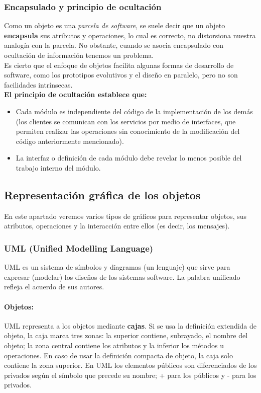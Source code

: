 \subsubsection{Encapsulado y principio de ocultación}
Como un objeto es una \emph{parcela de software}, se suele decir que
un objeto \textbf{encapsula} sus atributos y operaciones, lo cual es
correcto, no distorsiona nuestra analogía con la parcela. No obstante,
cuando se asocia encapsulado con ocultación de información tenemos un
problema.\\
Es cierto que el enfoque de objetos facilita algunas formas de
desarrollo de software, como los prototipos evolutivos y el diseño en
paralelo, pero no son facilidades intrínsecas.\\
\textbf{El principio de ocultación establece que:}
\begin{itemize}
\item Cada módulo es independiente del código de la implementación
  de los demás (los clientes se comunican con los servicios por
  medio de interfaces, que permiten realizar las operaciones sin
  conocimiento de la modificación del código anteriormente
  mencionado).
\item La interfaz o definición de cada módulo debe revelar lo menos
  posible del trabajo interno del módulo.
\end{itemize}

\newpage

\subsection{Representación gráfica de los objetos}
En este apartado veremos varios tipos de gráficos para representar
objetos, sus atributos, operaciones y la interacción entre ellos (es
decir, los mensajes).
\subsubsection{UML (Unified Modelling Language)}
UML es un sistema de símbolos y diagramas (un lenguaje) que sirve para
expresar (modelar) los diseños de los sistemas software. La palabra
unificado refleja el acuerdo de sus autores.

\paragraph{Objetos:}
UML representa a los objetos mediante \textbf{cajas}. Si se usa la
definición extendida de objeto, la caja marca tres zonas: la superior
contiene, subrayado, el nombre del objeto; la zona central contiene
los atributos y la inferior los métodos u operaciones. En caso de usar
la definición compacta de objeto, la caja solo contiene la zona
superior. En UML los elementos públicos son diferenciados de los
privados según el símbolo que precede su nombre; \textrm{+} para los públicos
y \textrm{-} para los privados.

